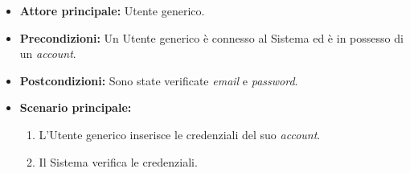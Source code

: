 \label{usecase:Accesso tradizionale}
\begin{itemize}

	\item \textbf{Attore principale:} Utente generico.

	\item \textbf{Precondizioni:} Un Utente generico è connesso al Sistema ed è in possesso di un \textit{account}.

	\item \textbf{Postcondizioni:} Sono state verificate \textit{email} e \textit{password}.

	\item \textbf{Scenario principale:}
	\begin{enumerate}
		\item L'Utente generico inserisce le credenziali del suo \textit{account}.
		\item Il Sistema verifica le credenziali.
	\end{enumerate}

\end{itemize}
